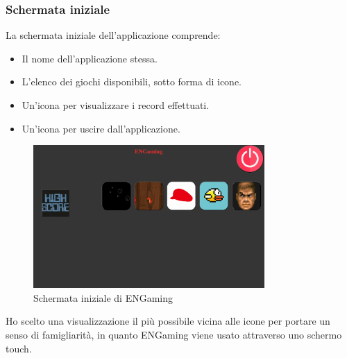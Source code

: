 \subsubsection{Schermata iniziale}
La schermata iniziale dell'applicazione comprende:
\begin{itemize}
    \item Il nome dell'applicazione stessa.
    \item L'elenco dei giochi disponibili, sotto forma di icone.
    \item Un'icona per visualizzare i record effettuati.
    \item Un'icona per uscire dall'applicazione.
\end{itemize}
\begin{figure}[h]
    \centering
    \includegraphics[width=250pt]{images/product/schermataIniziale.png}
    \caption{Schermata iniziale di ENGaming}
    \label{fig:schermataIniziale}
\end{figure}
Ho scelto una visualizzazione il più possibile vicina alle icone per portare un senso di famigliarità, in quanto ENGaming viene usato attraverso uno schermo touch.
\newpage
